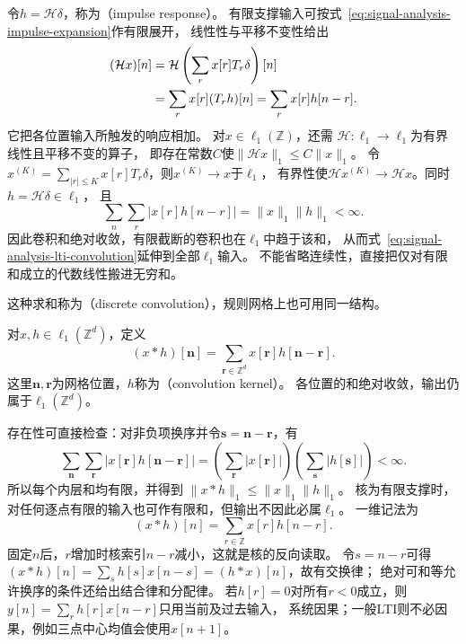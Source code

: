 令$h=\mathcal H\delta$，称为（impulse response）。
有限支撑输入可按式~\eqref{eq:signal-analysis-impulse-expansion}作有限展开，
线性性与平移不变性给出
\begin{align}
  (\mathcal Hx)[n]
  &=\mathcal H\left(\sum_r x[r]T_r\delta\right)[n]\notag\\
  &=\sum_r x[r](T_rh)[n]=\sum_r x[r]h[n-r].
  \label{eq:signal-analysis-lti-convolution}
\end{align}
它把各位置输入所触发的响应相加。
对$x\in\ell_1(\mathbb Z)$，还需
$\mathcal H:\ell_1\to\ell_1$为有界线性且平移不变的算子，
即存在常数$C$使$\|\mathcal Hx\|_1\leq C\|x\|_1$。
令$x^{(K)}=\sum_{|r|\leq K}x[r]T_r\delta$，则$x^{(K)}\to x$于$\ell_1$，
有界性使$\mathcal Hx^{(K)}\to\mathcal Hx$。同时$h=\mathcal H\delta\in\ell_1$，
且
\[
  \sum_n\sum_r|x[r]h[n-r]|=\|x\|_1\|h\|_1<\infty.
\]
因此卷积和绝对收敛，有限截断的卷积也在$\ell_1$中趋于该和，
从而式~\eqref{eq:signal-analysis-lti-convolution}延伸到全部$\ell_1$输入。
不能省略连续性，直接把仅对有限和成立的代数线性搬进无穷和。

这种求和称为（discrete convolution），规则网格上也可用同一结构。
\begin{definition}[网格上的离散卷积]
  \label{def:signal-analysis-discrete-convolution}
  对$x,h\in\ell_1(\mathbb Z^d)$，定义
  \begin{equation}
    (x*h)[\bm n]=\sum_{\bm r\in\mathbb Z^d}x[\bm r]h[\bm n-\bm r].
    \label{eq:signal-analysis-discrete-multidimensional-convolution}
  \end{equation}
  这里$\bm n,\bm r$为网格位置，$h$称为（convolution kernel）。
  各位置的和绝对收敛，输出仍属于$\ell_1(\mathbb Z^d)$。
\end{definition}
存在性可直接检查：对非负项换序并令$\bm s=\bm n-\bm r$，有
\[
  \sum_{\bm n}\sum_{\bm r}|x[\bm r]h[\bm n-\bm r]|
  =\left(\sum_{\bm r}|x[\bm r]|\right)
   \left(\sum_{\bm s}|h[\bm s]|\right)<\infty.
\]
所以每个内层和均有限，并得到
$\|x*h\|_1\leq\|x\|_1\|h\|_1$。
核为有限支撑时，对任何逐点有限的输入也可作有限和，但输出不因此必属$\ell_1$。
一维记法为
\begin{equation}
  (x*h)[n]=\sum_{r\in\mathbb Z}x[r]h[n-r].
  \label{eq:signal-analysis-linear-convolution}
\end{equation}
固定$n$后，$r$增加时核索引$n-r$减小，这就是核的反向读取。
令$s=n-r$可得$(x*h)[n]=\sum_s h[s]x[n-s]=(h*x)[n]$，故有交换律；
绝对可和等允许换序的条件还给出结合律和分配律。
若$h[r]=0$对所有$r<0$成立，则$y[n]=\sum_r h[r]x[n-r]$只用当前及过去输入，
系统因果；一般LTI则不必因果，例如三点中心均值会使用$x[n+1]$。

